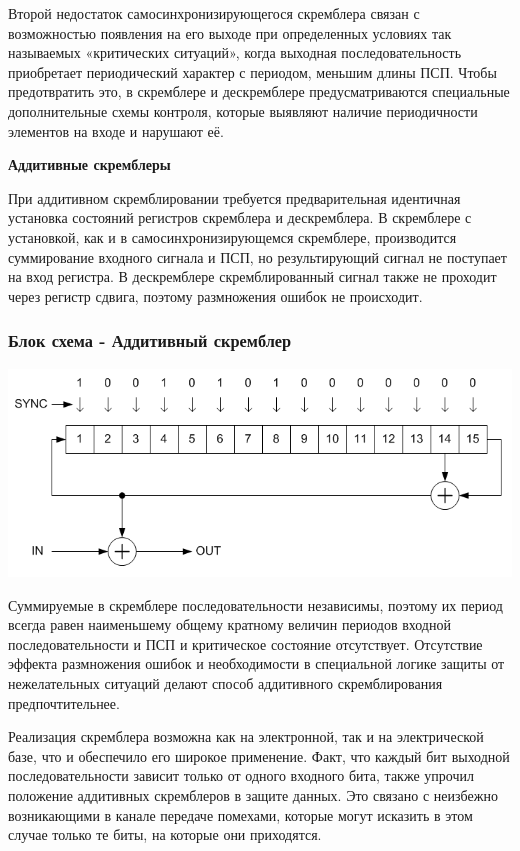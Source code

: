 Второй недостаток самосинхронизирующегося скремблера связан с возможностью появления на его выходе при определенных условиях так называемых «критических ситуаций», когда выходная последовательность приобретает периодический характер с периодом, меньшим длины ПСП. Чтобы предотвратить это, в скремблере и дескремблере предусматриваются специальные дополнительные схемы контроля, которые выявляют наличие периодичности элементов на входе и нарушают её.

   \begin{center}
  \large
 \bf Аддитивные скремблеры
 \end{center}
 
При аддитивном скремблировании требуется предварительная идентичная установка состояний регистров скремблера и дескремблера. В скремблере с установкой, как и в самосинхронизирующемся скремблере, производится суммирование входного сигнала и ПСП, но результирующий сигнал не поступает на вход регистра. В дескремблере скремблированный сигнал также не проходит через регистр сдвига, поэтому размножения ошибок не происходит.

\subsubsection{Блок схема - Аддитивный скремблер}
\begin{center}
\includegraphics[scale = 0.6]{additive}
\end{center}

Суммируемые в скремблере последовательности независимы, поэтому их период всегда равен наименьшему общему кратному величин периодов входной последовательности и ПСП и критическое состояние отсутствует. Отсутствие эффекта размножения ошибок и необходимости в специальной логике защиты от нежелательных ситуаций делают способ аддитивного скремблирования предпочтительнее.

Реализация скремблера возможна как на электронной, так и на электрической базе, что и обеспечило его широкое применение. Факт, что каждый бит выходной последовательности зависит только от одного входного бита, также упрочил положение аддитивных скремблеров в защите данных. Это связано с неизбежно возникающими в канале передаче помехами, которые могут исказить в этом случае только те биты, на которые они приходятся.

